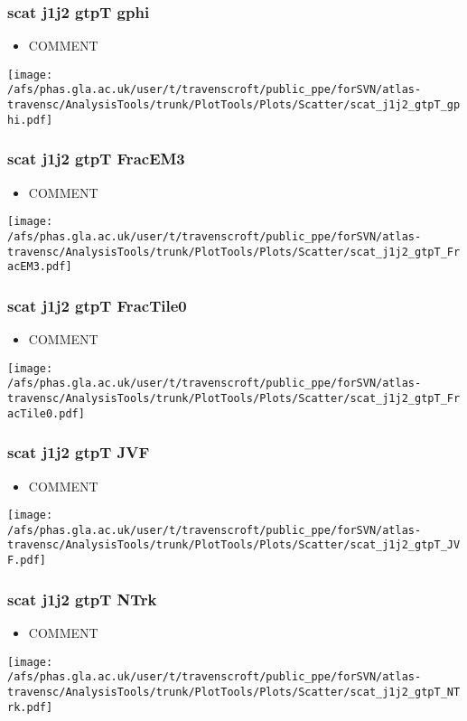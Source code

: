 \documentclass{beamer}
\begin{document}
\begin{frame}
\frametitle{scat j1j2 gtpT gphi}
\begin{itemize}
\item COMMENT
\end{itemize}
\begin{center}
\texttt{[image: /afs/phas.gla.ac.uk/user/t/travenscroft/public\_ppe/forSVN/atlas-travensc/AnalysisTools/trunk/PlotTools/Plots/Scatter/scat\_j1j2\_gtpT\_gphi.pdf]}
\end{center}
\end{frame}

\begin{frame}
\frametitle{scat j1j2 gtpT FracEM3}
\begin{itemize}
\item COMMENT
\end{itemize}
\begin{center}
\texttt{[image: /afs/phas.gla.ac.uk/user/t/travenscroft/public\_ppe/forSVN/atlas-travensc/AnalysisTools/trunk/PlotTools/Plots/Scatter/scat\_j1j2\_gtpT\_FracEM3.pdf]}
\end{center}
\end{frame}

\begin{frame}
\frametitle{scat j1j2 gtpT FracTile0}
\begin{itemize}
\item COMMENT
\end{itemize}
\begin{center}
\texttt{[image: /afs/phas.gla.ac.uk/user/t/travenscroft/public\_ppe/forSVN/atlas-travensc/AnalysisTools/trunk/PlotTools/Plots/Scatter/scat\_j1j2\_gtpT\_FracTile0.pdf]}
\end{center}
\end{frame}

\begin{frame}
\frametitle{scat j1j2 gtpT JVF}
\begin{itemize}
\item COMMENT
\end{itemize}
\begin{center}
\texttt{[image: /afs/phas.gla.ac.uk/user/t/travenscroft/public\_ppe/forSVN/atlas-travensc/AnalysisTools/trunk/PlotTools/Plots/Scatter/scat\_j1j2\_gtpT\_JVF.pdf]}
\end{center}
\end{frame}

\begin{frame}
\frametitle{scat j1j2 gtpT NTrk}
\begin{itemize}
\item COMMENT
\end{itemize}
\begin{center}
\texttt{[image: /afs/phas.gla.ac.uk/user/t/travenscroft/public\_ppe/forSVN/atlas-travensc/AnalysisTools/trunk/PlotTools/Plots/Scatter/scat\_j1j2\_gtpT\_NTrk.pdf]}
\end{center}
\end{frame}
\end{document}
